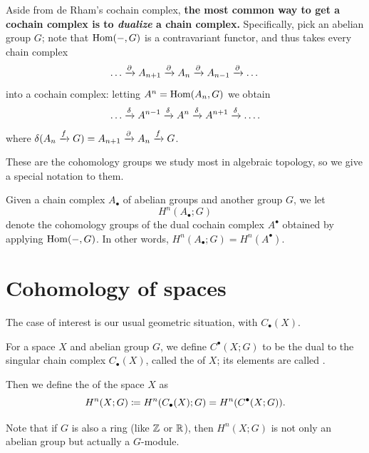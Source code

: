 Aside from de Rham's cochain complex,
\textbf{the most common way to get a cochain complex
is to \emph{dualize} a chain complex.}
Specifically, pick an abelian group $G$;
note that $\operatorname{Hom}(-, G)$ is a contravariant functor,
and thus takes every chain complex
\[ \dots \xrightarrow{\partial} A_{n+1} \xrightarrow{\partial}
	A_n \xrightarrow{\partial} A_{n-1} \xrightarrow{\partial} \dots \]
into a cochain complex: letting $A^n = \operatorname{Hom}(A_n, G)$ we obtain
\[ \dots \xrightarrow{\delta} A^{n-1} \xrightarrow{\delta}
	A^n \xrightarrow{\delta} A^{n+1} \xrightarrow{\delta} \dots. \]
where $\delta(A_n \xrightarrow{f} G) = A_{n+1} \xrightarrow{\partial} A_n \xrightarrow{f} G$.

These are the cohomology groups we study most in algebraic topology,
so we give a special notation to them.
\begin{definition}
	Given a chain complex $A_\bullet$ of abelian groups and another group $G$,
	we let \[ H^n(A_\bullet; G) \] denote the cohomology groups
	of the dual cochain complex $A^\bullet$ obtained by applying $\operatorname{Hom}(-,G)$.
	In other words, $H^n(A_\bullet; G) = H^n(A^\bullet)$.
\end{definition}

\section{Cohomology of spaces}

The case of interest is our usual geometric situation, with $C_\bullet(X)$.
\begin{definition}
	For a space $X$ and abelian group $G$,
	we define $C^\bullet(X;G)$ to be the dual to the
	singular chain complex $C_\bullet(X)$,
	called the  of $X$;
	its elements are called .

	Then we define the 
	of the space $X$ as
	\[ H^n(X; G) \coloneqq H^n(C_\bullet(X); G) = H^n(C^\bullet(X;G)). \]
\end{definition}
\begin{remark}
	Note that if $G$ is also a ring (like $\mathbb Z$ or $\mathbb R$),
	then $H^n(X; G)$ is not only an abelian group but actually a $G$-module.
\end{remark}

